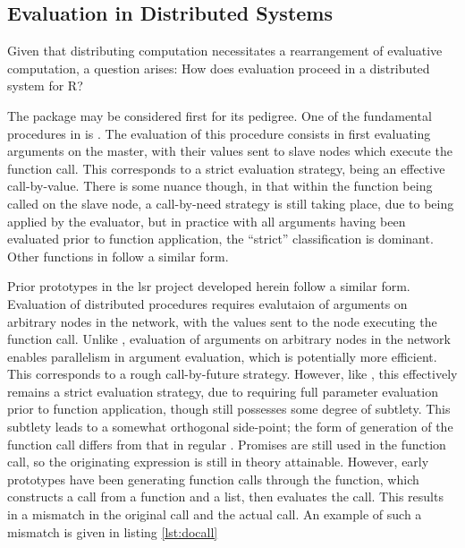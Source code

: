 \subsection{Evaluation in \R Distributed Systems}\label{sec:rdisteval}

Given that distributing computation necessitates a rearrangement of evaluative computation, a question arises: How does evaluation proceed in a distributed system for R?

The  package may be considered first for its pedigree.
One of the fundamental procedures in  is \cite{tierney2018snow}.
The evaluation of this procedure consists in first evaluating arguments on the master, with their values sent to slave nodes which execute the function call.
This corresponds to a strict evaluation strategy, being an effective call-by-value.
There is some nuance though, in that within the function being called on the slave node, a call-by-need strategy is still taking place, due to being applied by the \R evaluator, but in practice with all arguments having been evaluated prior to function application, the ``strict'' classification is dominant.
Other functions in  follow a similar form.

Prior prototypes in the lsr project developed herein follow a similar form.
Evaluation of distributed procedures requires evalutaion of arguments on arbitrary nodes in the network, with the values sent to the node executing the function call.
Unlike , evaluation of arguments on arbitrary nodes in the network enables parallelism in argument evaluation, which is potentially more efficient.
This corresponds to a rough call-by-future strategy.
However, like , this effectively remains a strict evaluation strategy, due to requiring full parameter evaluation prior to function application, though still possesses some degree of subtlety.
This subtlety leads to a somewhat orthogonal side-point; the form of generation of the function call differs from that in regular \R.
Promises are still used in the function call, so the originating expression is still in theory attainable.
However, early \lsr prototypes have been generating function calls through the  function, which constructs a call from a function and a list, then evaluates the call.
This results in a mismatch in the original call and the actual call.
An example of such a mismatch is given in listing \cref{lst:docall}


